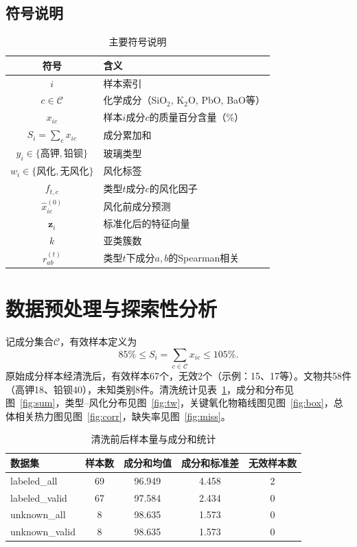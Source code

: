 \documentclass[UTF8,a4paper,12pt]{ctexart}
\begin{document}
\subsection{符号说明}
\begin{table}[H]
\centering
\caption{主要符号说明}
\begin{tabular}{cl}
\toprule
符号 & 含义 \\
\midrule
$i$ & 样本索引 \\
$c\in\mathcal{C}$ & 化学成分（SiO$_2$, K$_2$O, PbO, BaO等） \\
$x_{ic}$ & 样本$i$成分$c$的质量百分含量（\%） \\
$S_i=\sum_c x_{ic}$ & 成分累加和 \\
$y_i\in\{\text{高钾},\text{铅钡}\}$ & 玻璃类型 \\
$w_i\in\{\text{风化},\text{无风化}\}$ & 风化标签 \\
$f_{t,c}$ & 类型$t$成分$c$的风化因子 \\
$\hat{x}_{ic}^{(0)}$ & 风化前成分预测 \\
$\mathbf{z}_i$ & 标准化后的特征向量 \\
$k$ & 亚类簇数 \\
$r_{ab}^{(t)}$ & 类型$t$下成分$a,b$的Spearman相关 \\
\bottomrule
\end{tabular}
\end{table}

\section{数据预处理与探索性分析}
记成分集合$\mathcal{C}$，有效样本定义为
\begin{equation}
85\% \le S_i=\sum_{c\in\mathcal{C}} x_{ic} \le 105\%.
\end{equation}
原始成分样本经清洗后，有效样本67个，无效2个（示例：15、17等）。文物共58件（高钾18、铅钡40），未知类别8件。清洗统计见表~\ref{tab:clean}，成分和分布见图~\ref{fig:sum}，类型--风化分布见图~\ref{fig:tw}，关键氧化物箱线图见图~\ref{fig:box}，总体相关热力图见图~\ref{fig:corr}，缺失率见图~\ref{fig:miss}。

\begin{table}[H]
\centering
\caption{清洗前后样本量与成分和统计}
\label{tab:clean}
\scriptsize
\begin{tabular}{lcccc}
\toprule
数据集 & 样本数 & 成分和均值 & 成分和标准差 & 无效样本数 \\
\hline
labeled\_all & 69 & 96.949 & 4.458 & 2 \\
labeled\_valid & 67 & 97.584 & 2.434 & 0 \\
unknown\_all & 8 & 98.635 & 1.573 & 0 \\
unknown\_valid & 8 & 98.635 & 1.573 & 0 \\
\bottomrule
\end{tabular}
\end{table}
\end{document}
